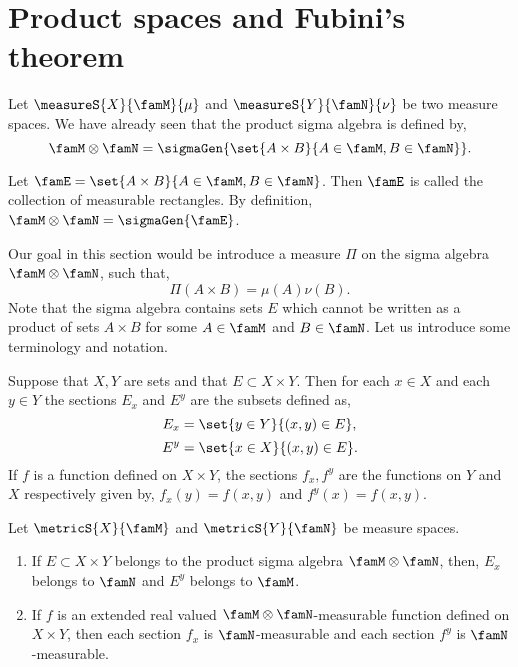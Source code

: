 \section{Product spaces and Fubini's theorem}
Let $\measureS{X}{\famM}{\mu}$ and $\measureS{Y}{\famN}{\nu}$ be two measure spaces. We have already seen that
the product sigma algebra is defined by,
\[\famM\otimes\famN = \sigmaGen{\set{A\times B}{A\in\famM,B\in\famN}}.\]
\begin{Definition}
    Let $\famE = \set{A\times B}{A\in\famM,B\in\famN}$. Then $\famE$ is called the collection of measurable
    rectangles. By definition, $\famM\otimes\famN = \sigmaGen{\famE}$.
\end{Definition}
Our goal in this section would be introduce a measure $\Pi$ on the sigma algebra $\famM\otimes\famN$, 
such that,
\[\Pi(A\times B) = \mu(A)\nu(B).\]
Note that the sigma algebra contains sets $E$ which cannot be written as a product of sets $A\times B$ for
some $A \in \famM$ and $B \in \famN$.
Let us introduce some terminology and notation. 
\begin{Definition}[name=sections]
    Suppose that $X,Y$ are sets and that $E \subset X\times Y$.
    Then for each $x \in X$ and each $y \in Y$ the sections $E_x$ and $E^{y}$ are the subsets defined as,
    \[E_x = \set{y\in Y}{(x,y)\in E},\]
    \[E^{y} = \set{x\in X}{(x,y)\in E}.\]
    If $f$ is a function defined on $X\times Y$, the sections $f_x,f^{y}$ are the functions on $Y$ and $X$
    respectively given by, $f_x(y) = f(x,y)$ and $f^{y}(x) = f(x,y)$.
\end{Definition}
\begin{Lemma}
    Let $\metricS{X}{\famM}$ and $\metricS{Y}{\famN}$ be measure spaces.
    \begin{enumerate}
	\item
	    If $E \subset X\times Y$ belongs to the product sigma algebra $\famM\otimes\famN$, then, 
	    $E_x$ belongs to $\famN$ and $E^{y}$ belongs to $\famM$.
	\item
	    If $f$ is an extended real valued $\famM\otimes\famN$-measurable function defined on $X\times Y$,
	    then each section $f_x$ is $\famN$-measurable and each section $f^{y}$ is $\famN$-measurable.
    \end{enumerate}
\end{Lemma}

